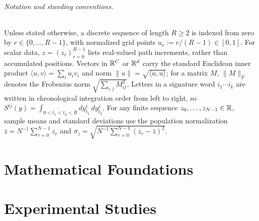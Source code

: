 \documentclass[10pt,a4paper]{article}
\numberwithin{equation}{section}
\theoremstyle{plain}
\theoremstyle{definition}
\begin{document}
\paragraph{Notation and standing conventions.}
Unless stated otherwise, a discrete sequence of length \(R \geq 2\) is indexed
from zero by \(r \in \{0, \ldots, R-1\}\), with normalized grid points
\(u_r := r/(R-1) \in [0, 1]\). For scalar data, \(z=(z_r)_{r=0}^{R-1}\)
lists real-valued path increments, rather than accumulated positions.
Vectors in \(\mathbb{R}^C\) or \(\mathbb{R}^d\) carry the standard
Euclidean inner product \(\langle u, v\rangle = \sum_i u_i v_i\) and norm
\(\|u\| = \sqrt{\langle u, u\rangle}\); for a matrix \(M\), \(\|M\|_F\) denotes
the Frobenius norm \(\sqrt{\sum_{i,j} M_{ij}^2}\). Letters in a signature word
\(i_1 \cdots i_k\) are written in chronological integration order from left to
right, so \(S^{ij}(y) = \int_{0 < t_1 < t_2 < R} dy_{t_1}^i \, dy_{t_2}^j\).
For any finite sequence \(z_0, \ldots, z_{N-1} \in \mathbb{R}\), sample means and
standard deviations use the population normalization
\(\bar z = N^{-1}\sum_{r=0}^{N-1} z_r\) and
\(\sigma_z = \sqrt{N^{-1}\sum_{r=0}^{N-1}(z_r - \bar z)^2}\).

\clearpage
\tableofcontents
\clearpage

\part{Mathematical Foundations}

\FloatBarrier{}

\FloatBarrier{}


\clearpage
\part{Experimental Studies}

\FloatBarrier{}

\FloatBarrier{}


\clearpage



\end{document}
